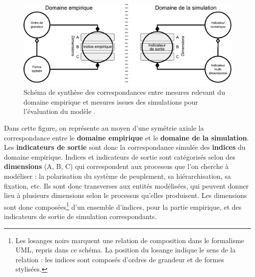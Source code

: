 \begin{figure}[H]
\includegraphics[width=\linewidth]{img/schema_indice_indicateur.pdf}
\caption[Schéma de synthèse des correspondances entre mesures empiriques et simulées.]{Schéma de synthèse des correspondances entre mesures relevant du domaine empirique et mesures issues des simulations pour l'évaluation du modèle \simfeodal{}.
}
\label{fig:schema_indices}
\end{figure}

Dans cette figure, on représente au moyen d'une symétrie axiale la correspondance entre le \textbf{domaine empirique} et le \textbf{domaine de la simulation}.
Les \textbf{indicateurs de sortie} sont donc la correspondance simulée des \textbf{indices} du domaine empirique.
Indices et indicateurs de sortie sont catégorisés selon des \textbf{dimensions} (A, B, C) qui correspondent aux processus que l'on cherche à modéliser : la polarisation du système de peuplement, sa hiérarchisation, sa fixation, etc.
Ils sont donc transverses aux entités modélisées, qui peuvent donner lieu à plusieurs dimensions selon le processus qu'elles produisent.
Les dimensions sont donc composées\footnote{
	Les losanges noirs marquent une relation de composition dans le formalisme UML, repris dans ce schéma.
	La position du losange indique le sens de la relation : les indices sont composés d'ordres de grandeur et de formes stylisées.
} d'un ensemble d'indices, pour la partie empirique, et des indicateurs de sortie de simulation correspondants.

